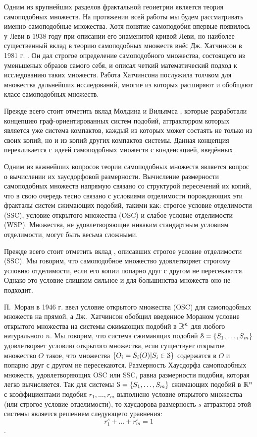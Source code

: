 Одним из крупнейших разделов фрактальной геоиетрии является теория самоподобных множеств.
На протяжении всей работы мы будем рассматривать именно самоподобные множества.
Хотя понятие самоподобия впервые появилось у Леви в 1938 году \cite{levi} при описании его знаменитой кривой Леви, но наиболее существенный вклад в теорию самоподобных множеств внёс Дж. Хатчинсон в 1981 г. \cite{Hut}.
Он дал строгое определение самоподобного множества, состоящего из уменьшеных образов самого себя, и описал четкий математический подход к исследованию таких множеств. 
Работа Хатчинсона послужила толчком для множества дальнейших исследований, многие из которых расширяют и обобщают класс самоподобных множеств.

Прежде всего стоит отметить вклад Молдина и Вильямса \cite{MW1981}, которые разработали концепцию граф-ориентированных систем подобий, аттракторром которых является уже система компактов, каждый из которых может состаять не только из своих копий, но и из копий других компактов системы.
Данная концепция перекликается с идеей самоподобных множеств с конденсацией, введённых .


Одним из важнейших вопросов теории самоподобных множеств является вопрос о вычислении их хаусдорфовой размерности.
Вычисление размерности самоподобных множеств напрямую связано со структурой пересечений их копий, что в свою очередь тесно связано с условиями отделимости порождающих эти фракталы систем сжимающих подобий, такими как: строгое условие отделимости (SSC), условие открытого множества (OSC) и слабое условие отделимости (WSP).
Множества, не удовлетворяющие никаким стандартным условиям отделимости, могут быть весьма сложными.

Прежде всего стоит отметить вклад , описавших строгое условие отделимости (SSC).
Мы говорим, что самоподобное множество удовлетворяет строгому условию отделимости, если его копии попарно друг с другом не пересекаются.
Однако это условие слишком сильное и для большинства множеств оно не подходит.

П.~Моран в 1946 г. \cite{Moran} ввел условие открытого множества (OSC) для самоподобных множеств на прямой, а Дж.~Хатчинсон \cite{Hut} обобщил введенное Мораном условие открытого множества на системы сжимающих подобий в $\mathbb{R}^n$ для любого натурального $n$.
Мы говорим, что система сжимающих подобий ${\EuScript S}=\{S_1, \ldots, S_m\}$ удовлетворяет условию открытого множества, если существует открытое множество $O$ такое, что множества $\{O_i=S_i(O) | S_i\in{\EuScript S}\}$ содержатся в $O$ и попарно друг с другом не пересекаются.
Размерность Хаусдорфа самоподобных множеств, удовлетворяющих OSC или SSC, равна размерности подобия, которая легко вычисляется.
Так для системы ${\EuScript S}=\{S_1,\ldots,S_m\}$ сжимающих подобий в $\mathbb{R}^n$ с коэффициентами подобия $r_1, \ldots, r_m$ выполнено условие открытого множества (или строгое условие отделимости), то хаусдорова размерность $s$ аттрактора этой системы является решением следующего уравнения: $$r_1^s+\ldots+r_m^s=1$$. 

